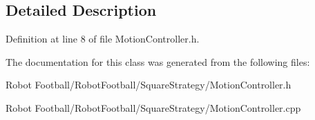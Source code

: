 \subsection{Detailed Description}


Definition at line 8 of file Motion\-Controller.\-h.



The documentation for this class was generated from the following files\-:\begin{DoxyCompactItemize}
\item 
Robot Football/\-Robot\-Football/\-Square\-Strategy/Motion\-Controller.\-h\item 
Robot Football/\-Robot\-Football/\-Square\-Strategy/Motion\-Controller.\-cpp\end{DoxyCompactItemize}
